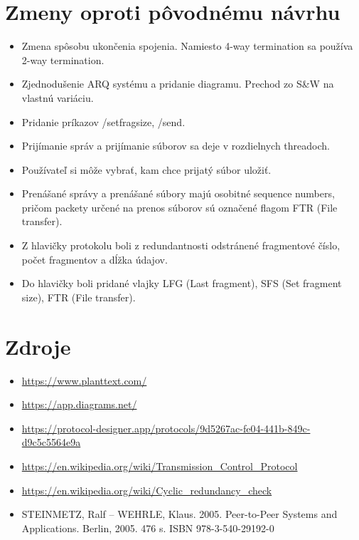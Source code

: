 \documentclass[a4paper,12pt]{article}
\begin{document}
\section{Zmeny oproti pôvodnému návrhu}
	\begin{itemize}
	    \item Zmena spôsobu ukončenia spojenia. Namiesto 4-way termination sa používa 2-way termination.
	    \item Zjednodušenie ARQ systému a pridanie diagramu. Prechod zo S\&W na vlastnú variáciu.
	    \item Pridanie príkazov /setfragsize, /send.
	    \item Prijímanie správ a prijímanie súborov sa deje v rozdielnych threadoch.
	    \item Používateľ si môže vybrať, kam chce prijatý súbor uložiť.
	    \item Prenášané správy a prenášané súbory majú osobitné sequence numbers, pričom packety určené na prenos súborov sú označené flagom FTR (File transfer).
	    \item Z hlavičky protokolu boli z redundantnosti odstránené fragmentové číslo, počet fragmentov a dĺžka údajov.
            \item Do hlavičky boli pridané vlajky LFG (Last fragment), SFS (Set fragment size), FTR (File transfer).
	\end{itemize}

\section{Zdroje}
	\begin{itemize}
	    \item \url{https://www.planttext.com/}
	    \item \url{https://app.diagrams.net/}
	    \item \url{https://protocol-designer.app/protocols/9d5267ac-fe04-441b-849c-d9c5c5564e9a}
	    \item \url{https://en.wikipedia.org/wiki/Transmission_Control_Protocol}
	    \item \url{https://en.wikipedia.org/wiki/Cyclic_redundancy_check}
	    \item STEINMETZ, Ralf – WEHRLE, Klaus. 2005. Peer-to-Peer Systems and Applications. Berlin, 2005. 476 s. ISBN 978-3-540-29192-0
	\end{itemize}
\end{document}
